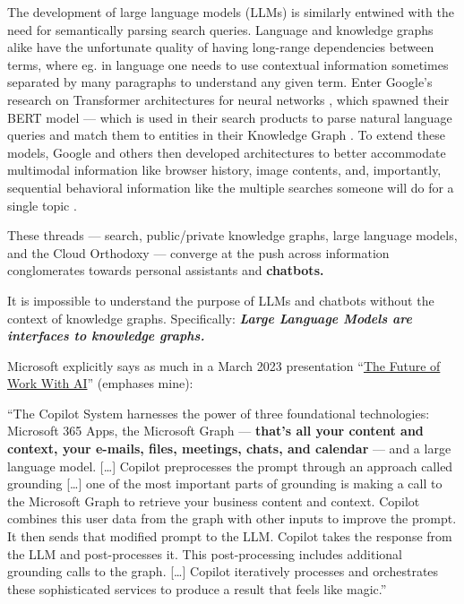 The development of large language models (LLMs) is similarly entwined
with the need for semantically parsing search queries. Language and
knowledge graphs alike have the unfortunate quality of having long-range
dependencies between terms, where eg. in language one needs to use
contextual information sometimes separated by many paragraphs to
understand any given term. Enter Google's research on Transformer
architectures for neural networks \cite{vaswaniAttentionAllYou2017} , which spawned their BERT model \cite{devlinBERTPretrainingDeep2019}  --- which is used in their search
products to parse natural language queries and match them to entities in
their Knowledge Graph \cite{nayakUnderstandingSearchesBetter2019} . To extend these models, Google and others then developed
architectures to better accommodate multimodal information like browser
history, image contents, and, importantly, sequential behavioral
information like the multiple searches someone will do for a single
topic \cite{nayakMUMNewAI2021, tayHyperGridTransformersSingle2021, huUniTMultimodalMultitask2021} .

These threads --- search, public/private knowledge graphs, large
language models, and the Cloud Orthodoxy --- converge at the push across
information conglomerates towards personal assistants and
\textbf{chatbots.}

It is impossible to understand the purpose of LLMs and chatbots without
the context of knowledge graphs. Specifically: \textbf{\emph{Large
Language Models are interfaces to knowledge graphs.}}

Microsoft explicitly says as much in a March 2023 presentation
``\href{https://www.youtube.com/watch?v=Bf-dbS9CcRU}{The Future of Work
With AI}'' (emphases mine):

\begin{leftbar}
``The Copilot System harnesses the power of three foundational
technologies: Microsoft 365 Apps, the Microsoft Graph --- \textbf{that's
all your content and context, your e-mails, files, meetings, chats, and
calendar} --- and a large language model. {[}\ldots{]} Copilot
preprocesses the prompt through an approach called grounding
{[}\ldots{]} one of the most important parts of grounding is making a
call to the Microsoft Graph to retrieve your business content and
context. Copilot combines this user data from the graph with other
inputs to improve the prompt. It then sends that modified prompt to the
LLM. Copilot takes the response from the LLM and post-processes it. This
post-processing includes additional grounding calls to the graph.
{[}\ldots{]} Copilot iteratively processes and orchestrates these
sophisticated services to produce a result that feels like magic.'' \cite{microsoftFutureWorkAI2023} 
\end{leftbar}

